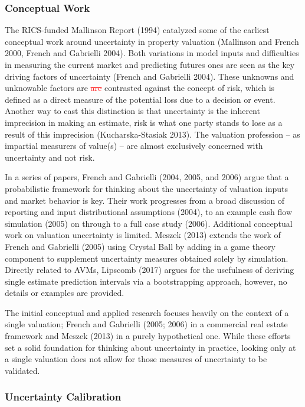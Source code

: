 \documentclass[colTwo]{anon}
\theoremstyle{definition}
\begin{document}
\subsubsection{Conceptual Work}

The RICS-funded Mallinson Report (1994) catalyzed some of the earliest conceptual work around uncertainty in property valuation (Mallinson and French 2000, French and Gabrielli 2004). Both variations in model inputs and difficulties in measuring the current market and predicting futures ones are seen as the key driving factors of uncertainty (French and Gabrielli 2004). These unknowns and unknowable factors are \textcolor{red}{\st{are}}  contrasted against the concept of risk, which is defined as a direct measure of the potential loss due to a decision or event.  Another way to cast this distinction is that uncertainty is the inherent imprecision in making an estimate, risk is what one party stands to lose as a result of this imprecision (Kucharska-Stasiak 2013).  The valuation profession -- as impartial measurers of value(s) -- are almost exclusively concerned with uncertainty and not risk.

In a series of papers, French and Gabrielli (2004, 2005, and 2006) argue that a probabilistic framework for thinking about the uncertainty of valuation inputs and market behavior is key. Their work progresses from a broad discussion of reporting and input distributional assumptions (2004), to an example cash flow simulation (2005) on through to a full case study (2006). Additional conceptual work on valuation uncertainty is limited.  Meszek (2013) extends the work of French and Gabrielli (2005) using Crystal Ball by adding in a game theory component to supplement uncertainty measures obtained solely by simulation.  Directly related to AVMs, Lipscomb (2017) argues for the usefulness of deriving single estimate prediction intervals via a bootstrapping approach, however, no details or examples are provided. 

The initial conceptual and applied research focuses heavily on the context of a single valuation; French and Gabrielli (2005; 2006) in a commercial real estate framework and Meszek (2013) in a purely hypothetical one. While these efforts set a solid foundation for thinking about uncertainty in practice, looking only at a single valuation does not allow for those measures of uncertainty to be validated. 

\subsubsection{Uncertainty Calibration}
\end{document}
